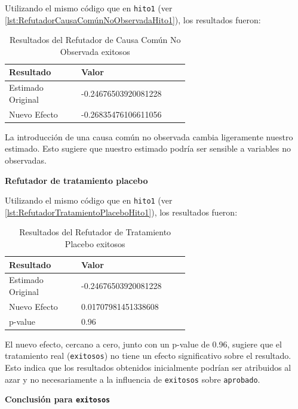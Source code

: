 Utilizando el mismo código que en \texttt{hito1} (ver \ref{lst:RefutadorCausaComúnNoObservadaHito1}), los resultados fueron:

\begin{table}[H]
    \centering
    \begin{tabular}{lp{0.6\linewidth}}
        \toprule
        \textbf{Resultado} & \textbf{Valor} \\
        \midrule
        Estimado Original & -0.24676503920081228 \\
        Nuevo Efecto & -0.26835476106611056 \\
        \bottomrule
    \end{tabular}
    \caption{Resultados del Refutador de Causa Común No Observada exitosos}
    \label{tab:refutador_causa_no_observada_exitosos}
\end{table}

La introducción de una causa común no observada cambia ligeramente nuestro estimado. Esto sugiere que nuestro estimado podría ser sensible a variables no observadas.

\textbf{Refutador de tratamiento placebo}

Utilizando el mismo código que en \texttt{hito1} (ver \ref{lst:RefutadorTratamientoPlaceboHito1}), los resultados fueron:

\begin{table}[H]
    \centering
    \begin{tabular}{lp{0.6\linewidth}}
        \toprule
        \textbf{Resultado} & \textbf{Valor} \\
        \midrule
        Estimado Original & -0.24676503920081228 \\
        Nuevo Efecto & 0.01707981451338608 \\
        p-value & 0.96 \\
        \bottomrule
    \end{tabular}
    \caption{Resultados del Refutador de Tratamiento Placebo exitosos}
    \label{tab:refutador_placebo_exitosos}
\end{table}

El nuevo efecto, cercano a cero, junto con un p-value de 0.96, sugiere que el tratamiento real (\texttt{exitosos}) no tiene un efecto significativo sobre el resultado. Esto indica que los resultados obtenidos inicialmente podrían ser atribuidos al azar y no necesariamente a la influencia de \texttt{exitosos} sobre \texttt{aprobado}.

\textbf{Conclusión para \texttt{exitosos}}

